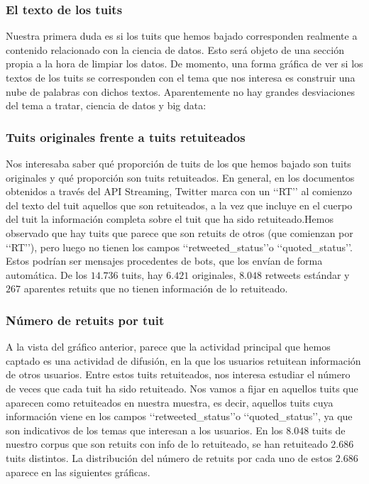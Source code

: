 \subsubsection{El texto de los tuits}
Nuestra primera duda es si los tuits que hemos bajado corresponden realmente a contenido relacionado
con la ciencia de datos. Esto será objeto de una sección propia a la hora de limpiar los datos.
De momento, una forma gráfica de ver si los textos de los tuits se corresponden con el tema
que nos interesa es construir una nube de palabras con dichos textos. Aparentemente no hay grandes desviaciones del tema a tratar, ciencia de datos y big data:




\subsubsection{Tuits originales frente a tuits retuiteados}
Nos interesaba saber qué proporción de tuits de los que hemos bajado son tuits originales
y qué proporción son tuits retuiteados. En general, en los documentos obtenidos a través
del API Streaming, Twitter marca con un \lq\lq RT\rq\rq
al comienzo del texto del tuit aquellos que son retuiteados, a la vez que incluye en el cuerpo del
tuit la información completa sobre el tuit que ha sido retuiteado.Hemos observado
que hay tuits que parece que son retuits de otros (que comienzan por  \lq\lq RT\rq\rq), pero luego
no tienen los campos \lq\lq retweeted\_status\rq\rq o \lq\lq quoted\_status\rq\rq. Estos podrían ser mensajes procedentes
de bots, que los envían de forma automática. De los $14.736$ tuits,  hay 
$6.421$ originales, $8.048$ retweets estándar y $267$ aparentes retuits que no tienen información
de lo retuiteado.


\subsubsection{Número de retuits por tuit}
A la vista del gráfico anterior, parece que la actividad principal que hemos captado es
una actividad de difusión, en la que los usuarios retuitean información de otros usuarios.
Entre estos tuits retuiteados, nos interesa estudiar el número de veces que 
cada tuit ha sido retuiteado. Nos vamos a fijar en aquellos tuits que aparecen como retuiteados en nuestra muestra, es decir, aquellos tuits cuya información viene en los campos \lq\lq retweeted\_status\rq\rq o \lq\lq quoted\_status\rq\rq,
ya que son indicativos de los temas que interesan a los usuarios.
En los $8.048$ tuits de nuestro corpus que son retuits con info de lo retuiteado, se han retuiteado $2.686$ tuits distintos. La distribución del número de retuits por cada uno de estos $2.686$ aparece en las siguientes
gráficas.

